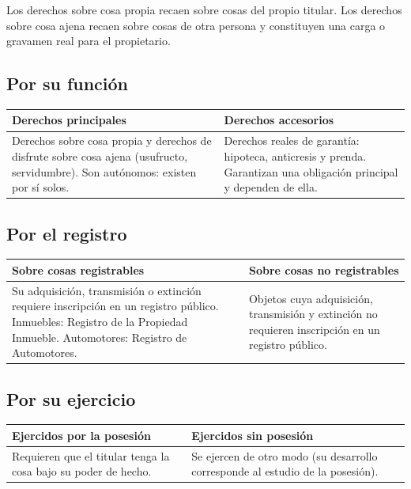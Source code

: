 \documentclass[12pt,oneside]{book}
\begin{document}
Los derechos sobre cosa propia recaen sobre cosas del propio titular. Los derechos sobre cosa ajena recaen sobre cosas de otra persona y constituyen una carga o gravamen real para el propietario.

\subsection{Por su funci\'on}

\begin{table}[H]
\centering
\begin{tabularx}{\textwidth}{
    >{\raggedright\arraybackslash}X
    >{\raggedright\arraybackslash}X
}
\toprule
\textbf{Derechos principales} & \textbf{Derechos accesorios} \\
\midrule
Derechos sobre cosa propia y derechos de disfrute sobre cosa ajena (usufructo, servidumbre). Son aut\'onomos: existen por s\'i solos. &
Derechos reales de garant\'ia: hipoteca, anticresis y prenda. Garantizan una obligaci\'on principal y dependen de ella. \\
\bottomrule
\end{tabularx}
\end{table}

\subsection{Por el registro}

\begin{table}[H]
\centering
\begin{tabularx}{\textwidth}{
    >{\raggedright\arraybackslash}X
    >{\raggedright\arraybackslash}X
}
\toprule
\textbf{Sobre cosas registrables} & \textbf{Sobre cosas no registrables} \\
\midrule
Su adquisici\'on, transmisi\'on o extinci\'on requiere inscripci\'on en un registro p\'ublico. Inmuebles: Registro de la Propiedad Inmueble. Automotores: Registro de Automotores. &
Objetos cuya adquisici\'on, transmisi\'on y extinci\'on no requieren inscripci\'on en un registro p\'ublico. \\
\bottomrule
\end{tabularx}
\end{table}

\subsection{Por su ejercicio}

\begin{table}[H]
\centering
\begin{tabularx}{\textwidth}{
    >{\raggedright\arraybackslash}X
    >{\raggedright\arraybackslash}X
}
\toprule
\textbf{Ejercidos por la posesi\'on} & \textbf{Ejercidos sin posesi\'on} \\
\midrule
Requieren que el titular tenga la cosa bajo su poder de hecho. &
Se ejercen de otro modo (su desarrollo corresponde al estudio de la posesi\'on). \\
\bottomrule
\end{tabularx}
\end{table}
\end{document}
